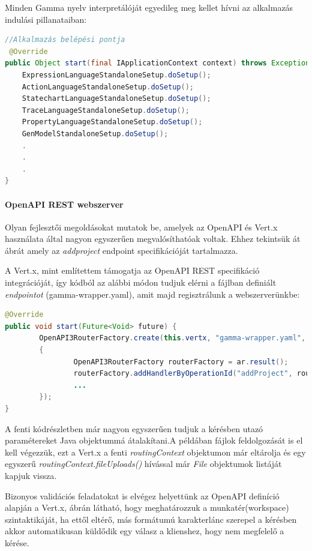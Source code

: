 Minden Gamma nyelv interpretálóját egyedileg meg kellet hívni az alkalmazás indulási pillanataiban:

\begin{lstlisting}[language=Java]
//Alkalmazás belépési pontja
 @Override
public Object start(final IApplicationContext context) throws Exception {
	ExpressionLanguageStandaloneSetup.doSetup();
	ActionLanguageStandaloneSetup.doSetup();
	StatechartLanguageStandaloneSetup.doSetup();
	TraceLanguageStandaloneSetup.doSetup();
	PropertyLanguageStandaloneSetup.doSetup();        
	GenModelStandaloneSetup.doSetup();
	.
	.
	.
}
\end{lstlisting}

\paragraph{OpenAPI REST webszerver} Olyan fejlesztői megoldásokat mutatok be, amelyek az OpenAPI és Vert.x használata által nagyon egyszerűen megvalósíthatóak voltak. Ehhez tekintsük át  ábrát amely az \textit{addproject} endpoint specifikációját tartalmazza.

A Vert.x, mint említettem támogatja az OpenAPI REST specifikáció integrációját, így kódból az alábbi módon tudjuk elérni a fájlban definiált \textit{endpointot} (gamma-wrapper.yaml), amit majd regisztrálunk a webszerverünkbe:
\begin{lstlisting}[language=Java]
@Override
public void start(Future<Void> future) {
        OpenAPI3RouterFactory.create(this.vertx, "gamma-wrapper.yaml", ar ->
		{
               	OpenAPI3RouterFactory routerFactory = ar.result();
                routerFactory.addHandlerByOperationId("addProject", routingContext -> {	... });
				...	
		});
}
\end{lstlisting}
A fenti kódrészletben már nagyon egyszerűen tudjuk a kérésben utazó paramétereket Java objektummá átalakítani.A példában fájlok feldolgozását is el kell végezzük, ezt a Vert.x a fenti \textit{routingContext} objektumon már eltárolja és egy egyszerű \textit{routingContext.fileUploads()} hívással már \textit{File} objektumok listáját kapjuk vissza.


Bizonyos validációs feladatokat is elvégez helyettünk az OpenAPI definíció alapján a Vert.x,  ábrán látható, hogy meghatározzuk a munkatér(workspace) szintaktikáját, ha ettől eltérő, más formátumú karakterlánc szerepel a kérésben akkor automatikusan küldődik egy válasz a klienshez, hogy nem megfelelő a kérése.



